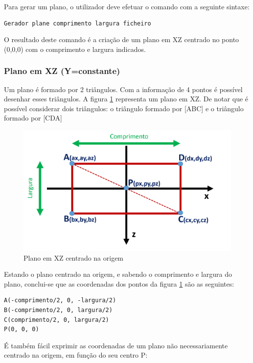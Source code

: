 Para gerar um plano, o utilizador deve efetuar o comando com a seguinte sintaxe:

\begin{Verbatim}
Gerador plane comprimento largura ficheiro
\end{Verbatim}

O resultado deste comando é a criação de um plano em XZ centrado no ponto (0,0,0) com o comprimento e largura indicados.

\subsubsection{Plano em XZ (Y=constante)}

Um plano é formado por 2 triângulos. Com a informação de 4 pontos é possível desenhar esses triângulos. A figura \ref{p1:fig:p1_planoY} representa um plano em XZ. De notar que é possível considerar dois triângulos: o triângulo formado por [ABC] e o triângulo formado por [CDA]

\begin{figure}[<+htpb+>]
	\centering
	\includegraphics[scale=0.5]{imagens/p3_planoY.png}
	\caption{Plano em XZ centrado na origem}
	\label{p1:fig:p1_planoY}
\end{figure}

Estando o plano centrado na origem, e sabendo o comprimento e largura do plano, conclui-se que as coordenadas dos pontos da figura \ref{p1:fig:p1_planoY} são as seguintes:

\begin{Verbatim}
A(-comprimento/2, 0, -largura/2)
B(-comprimento/2, 0, largura/2)
C(comprimento/2, 0, largura/2)
P(0, 0, 0)
\end{Verbatim}

É também fácil exprimir as coordenadas de um plano não necessariamente centrado na origem, em função do seu centro P:

